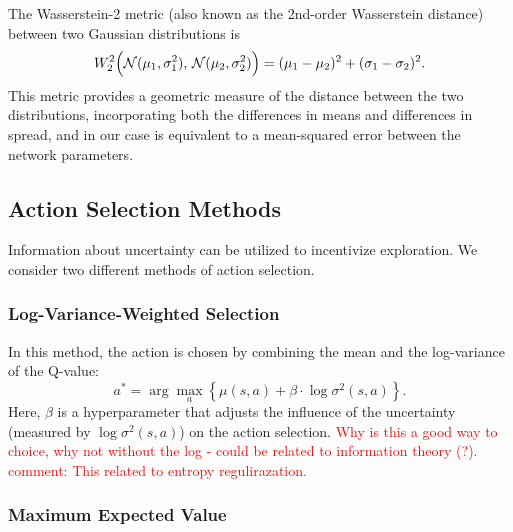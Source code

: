 \documentclass[12pt,a4paper]{report}
\newcommand\myworries[1]{\textcolor{red}{#1}}
\begin{document}
The Wasserstein-2 metric (also known as the 2nd-order Wasserstein distance) between two Gaussian distributions is
\[
  W_2^2\Bigl(\mathcal{N}(\mu_1, \sigma_1^2),\,\mathcal{N}(\mu_2, \sigma_2^2)\Bigr)
  = (\mu_1 - \mu_2)^2 + (\sigma_1 - \sigma_2)^2.
\]
This metric provides a geometric measure of the distance between the two distributions, incorporating both the differences in means and differences in spread, and in our case is equivalent to a mean-squared error between the network parameters.

\subsection{Action Selection Methods}

Information about uncertainty can be utilized to incentivize exploration. We consider two different methods of action selection.

\subsubsection{Log-Variance-Weighted Selection}
In this method, the action is chosen by combining the mean and the log-variance of the Q-value:
\[
  a^* = \arg\max_{a} \left\{ \mu(s, a) + \beta \cdot \log \sigma^2(s, a) \right\}.
\]
Here, \(\beta\) is a hyperparameter that adjusts the influence of the uncertainty (measured by \(\log \sigma^2(s,a)\)) on the action selection. \myworries{Why is this a good way to choice, why not without the log - could be related to information theory (?). comment: This related to entropy regulirazation. } 

\subsubsection{Maximum Expected Value}
\end{document}
